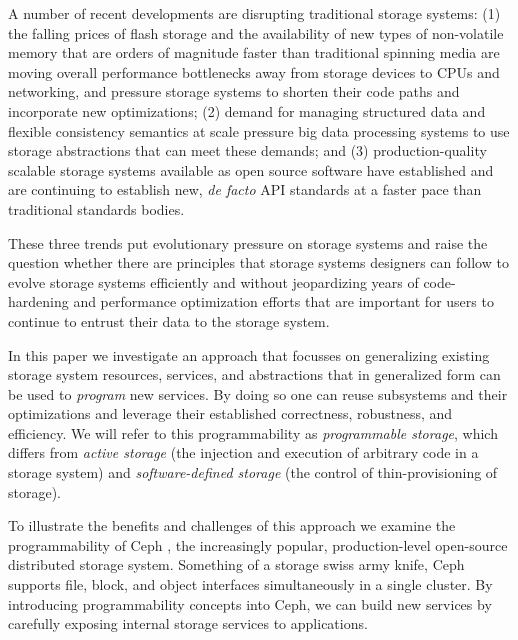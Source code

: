 \documentclass[10pt,twocolumn]{article}
\begin{document}
A number of recent developments are disrupting traditional storage
systems: (1) the falling prices of flash storage and the availability of
new types of non-volatile memory that are orders of magnitude faster
than traditional spinning media are moving overall performance
bottlenecks away from storage devices to CPUs and networking, and
pressure storage systems to shorten their code paths and incorporate new
optimizations; (2) demand for managing structured data and flexible
consistency semantics at scale pressure big data processing systems to
use storage abstractions that can meet these demands; and (3)
production-quality scalable storage systems available as open source
software have established and are continuing to establish new, \emph{de
facto} API standards at a faster pace than traditional standards bodies.

These three trends put evolutionary pressure on storage systems and
raise the question whether there are principles that storage systems
designers can follow to evolve storage systems efficiently and without
jeopardizing years of code-hardening and performance optimization
efforts that are important for users to continue to entrust their data
to the storage system.

In this paper we investigate an approach that focusses on generalizing
existing storage system resources, services, and abstractions that in
generalized form can be used to \emph{program} new services. By doing so
one can reuse subsystems and their optimizations and leverage their
established correctness, robustness, and efficiency. We will refer to
this programmability as \emph{programmable storage}, which differs from
\emph{active storage} (the injection and execution of arbitrary code in
a storage system) and \emph{software-defined storage} (the control of
thin-provisioning of storage).

To illustrate the benefits and challenges of this approach we examine
the programmability of Ceph \autocite{weil_ceph_2006}, the increasingly
popular, production-level open-source distributed storage system.
Something of a storage swiss army knife, Ceph supports file, block, and
object interfaces simultaneously in a single cluster. By introducing
programmability concepts into Ceph, we can build new services by
carefully exposing internal storage services to applications.
\end{document}
